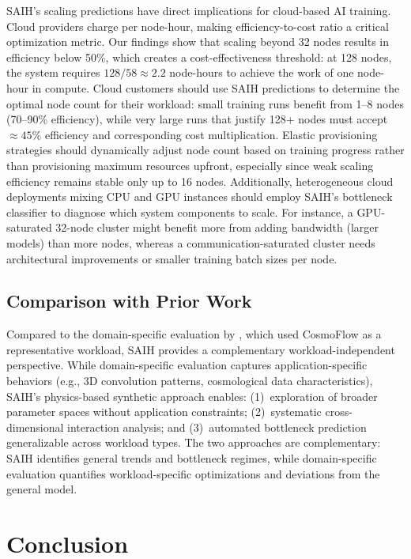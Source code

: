 \documentclass{llncs}
\begin{document}
SAIH's scaling predictions have direct implications for cloud-based AI training. Cloud providers charge per node-hour, making efficiency-to-cost ratio a critical optimization metric. Our findings show that scaling beyond 32 nodes results in efficiency below 50\%, which creates a cost-effectiveness threshold: at 128 nodes, the system requires $128 / 58 \approx 2.2$ node-hours to achieve the work of one node-hour in compute. Cloud customers should use SAIH predictions to determine the optimal node count for their workload: small training runs benefit from 1--8 nodes (70--90\% efficiency), while very large runs that justify 128+ nodes must accept $\approx 45\%$ efficiency and corresponding cost multiplication. Elastic provisioning strategies should dynamically adjust node count based on training progress rather than provisioning maximum resources upfront, especially since weak scaling efficiency remains stable only up to 16 nodes. Additionally, heterogeneous cloud deployments mixing CPU and GPU instances should employ SAIH's bottleneck classifier to diagnose which system components to scale. For instance, a GPU-saturated 32-node cluster might benefit more from adding bandwidth (larger models) than more nodes, whereas a communication-saturated cluster needs architectural improvements or smaller training batch sizes per node.

\subsection{Comparison with Prior Work}

Compared to the domain-specific evaluation by \citet{Wang2024SAIH}, which used CosmoFlow as a representative workload, SAIH provides a complementary workload-independent perspective. While domain-specific evaluation captures application-specific behaviors (e.g., 3D convolution patterns, cosmological data characteristics), SAIH's physics-based synthetic approach enables: (1)~exploration of broader parameter spaces without application constraints; (2)~systematic cross-dimensional interaction analysis; and (3)~automated bottleneck prediction generalizable across workload types. The two approaches are complementary: SAIH identifies general trends and bottleneck regimes, while domain-specific evaluation quantifies workload-specific optimizations and deviations from the general model.

\section{Conclusion}
\end{document}
